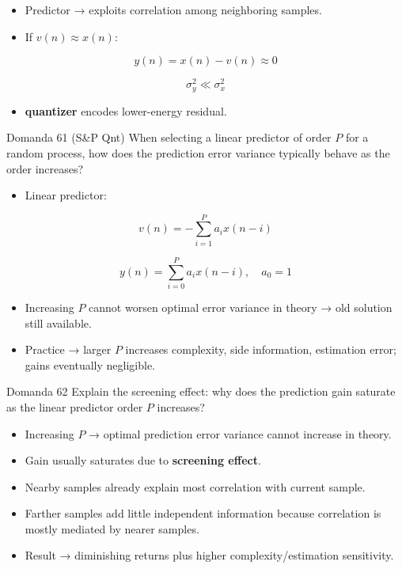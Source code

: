 \begin{itemize}
  \item Predictor → exploits correlation among neighboring samples.
  \item If $v(n)\approx x(n)$:
\end{itemize}


$$
y(n)=x(n)-v(n)\approx 0
$$



$$
\sigma_y^2 \ll \sigma_x^2
$$


\begin{itemize}
  \item \textbf{quantizer} encodes lower-energy residual.
\end{itemize}



\begin{questionbox}{Domanda 61}
(S\&P Qnt) When selecting a linear predictor of order $P$ for a random process, how does the prediction error variance typically behave as the order increases?
\end{questionbox}


\begin{itemize}
  \item Linear predictor:
\end{itemize}


$$
v(n)=-\sum_{i=1}^{P}a_i x(n-i)
$$



$$
y(n)=\sum_{i=0}^{P}a_i x(n-i),\quad a_0=1
$$


\begin{itemize}
  \item Increasing $P$ cannot worsen optimal error variance in theory → old solution still available.
  \item Practice → larger $P$ increases complexity, side information, estimation error; gains eventually negligible.
\end{itemize}



\begin{questionbox}{Domanda 62}
Explain the screening effect: why does the prediction gain saturate as the linear predictor order $P$ increases?
\end{questionbox}


\begin{itemize}
  \item Increasing $P$ → optimal prediction error variance cannot increase in theory.
  \item Gain usually saturates due to \textbf{screening effect}.
  \item Nearby samples already explain most correlation with current sample.
  \item Farther samples add little independent information because correlation is mostly mediated by nearer samples.
  \item Result → diminishing returns plus higher complexity/estimation sensitivity.
\end{itemize}



